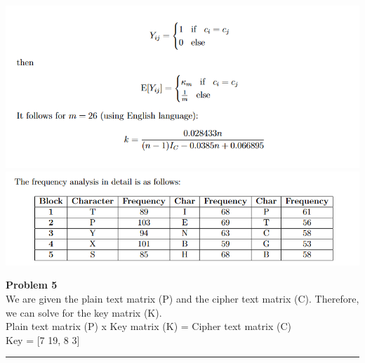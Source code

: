 \documentclass[a4paper, 11pt]{article}
\newenvironment{problem}[2][Problem]
    { \begin{mdframed}[backgroundcolor=gray!20] \textbf{#1 #2} \\}
    {  \end{mdframed}}
\begin{document}
\includegraphics[scale=1]{q2_4_1.png}
\includegraphics[scale=0.8]{q2_4_2.png}
\begin{problem}{5}
We are given the plain text matrix (P) and the cipher text matrix (C). Therefore, we can solve for the key matrix (K).\\
Plain text matrix (P) x Key matrix (K) = Cipher text matrix (C)\\

Key = [7 19, 8 3]
\end{problem}
\noindent\rule{7in}{2.8pt}
\end{document}
